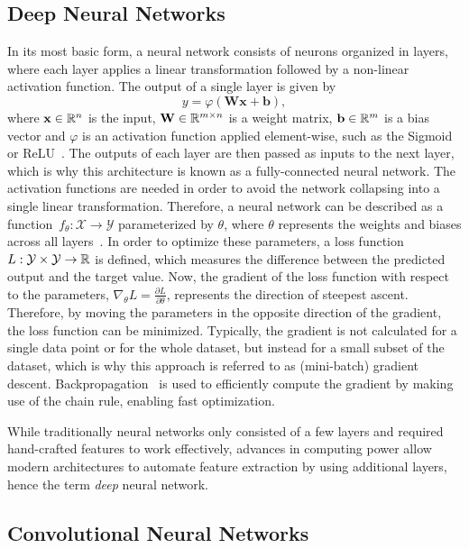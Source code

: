 \subsection{Deep Neural Networks}

In its most basic form, a neural network consists of neurons organized in layers, where each layer applies a linear transformation followed by a non-linear activation function.
The output of a single layer is given by
\begin{equation}
    y = \varphi(\mathbf{W}\mathbf{x} + \mathbf{b}),
\end{equation}
where $\mathbf{x} \in \mathbb{R}^n$ is the input, $\mathbf{W} \in \mathbb{R}^{m \times n}$ is a weight matrix, $\mathbf{b} \in \mathbb{R}^m$ is a bias vector and $\varphi$ is an activation function applied element-wise, such as the Sigmoid or ReLU~\cite{ReLU}.
The outputs of each layer are then passed as inputs to the next layer, which is why this architecture is known as a fully-connected neural network. 
The activation functions are needed in order to avoid the network collapsing into a single linear transformation. 
Therefore, a neural network can be described as a function~$f_{\theta}: \mathcal{X} \rightarrow \mathcal{Y}$ parameterized by $\theta$, where $\theta$ represents the weights and biases across all layers~\cite{DeepLearning}.
In order to optimize these parameters, a loss function~$L: \mathcal{Y} \times \mathcal{Y} \rightarrow \mathbb{R}$ is defined, which measures the difference between the predicted output and the target value. 
Now, the gradient of the loss function with respect to the parameters, $\nabla_\theta L = \frac{\partial L}{\partial \theta}$, represents the direction of steepest ascent.
Therefore, by moving the parameters in the opposite direction of the gradient, the loss function can be minimized.
Typically, the gradient is not calculated for a single data point or for the whole dataset, but instead for a small subset of the dataset, which is why this approach is referred to as (mini-batch) gradient descent.
Backpropagation~\cite{Backpropagation} is used to efficiently compute the gradient by making use of the chain rule, enabling fast optimization.

While traditionally neural networks only consisted of a few layers and required hand-crafted features to work effectively, advances in computing power allow modern architectures to automate feature extraction by using additional layers, hence the term \textit{deep} neural network.

\subsection{Convolutional Neural Networks}


